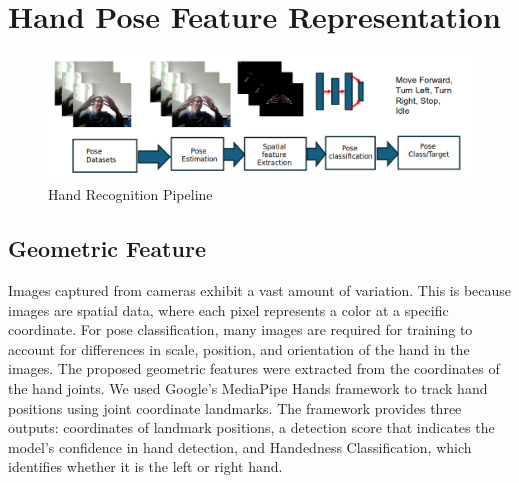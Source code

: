 
\chapter{Hand Pose Feature Representation}
\begin{figure}[h!]
	\centering
	\includegraphics[width=\linewidth]{img/pose_pipeline} %
	\caption{Hand Recognition Pipeline}
	\label{fig:pose_pipeline} %
\end{figure}

\section{Geometric Feature}
Images captured from cameras exhibit a vast amount of variation. This is because images are spatial data, where each pixel represents a color at a specific coordinate. For pose classification, many images are required for training to account for differences in scale, position, and orientation of the hand in the images. The proposed geometric features were extracted from the coordinates of the hand joints. We used Google's MediaPipe Hands framework to track hand positions using joint coordinate landmarks. The framework provides three outputs: coordinates of landmark positions, a detection score that indicates the model's confidence in hand detection, and Handedness Classification, which identifies whether it is the left or right hand. 

